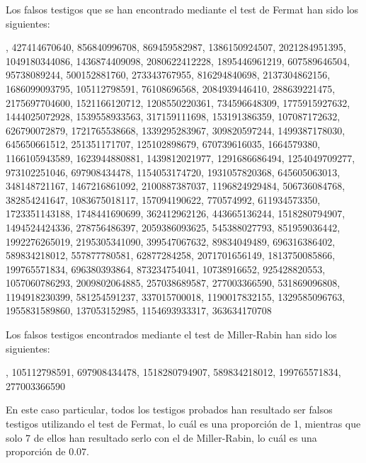 \documentclass[11pt,a4paper]{article}
\begin{document}
Los falsos testigos que se han encontrado mediante el test de Fermat han sido los siguientes:

, 427414670640, 856840996708, 869459582987, 1386150924507, 2021284951395, 1049180344086, 1436874409098, 2080622412228, 1895446961219, 607589646504, 95738089244, 500152881760, 273343767955, 816294840698, 2137304862156, 1686099093795, 105112798591, 76108696568, 2084939446410, 288639221475, 2175697704600, 1521166120712, 1208550220361, 734596648309, 1775915927632, 1444025072928, 1539558933563, 317159111698, 153191386359, 107087172632, 626790072879, 1721765538668, 1339295283967, 309820597244, 1499387178030, 645650661512, 251351171707, 125102898679, 670739616035, 1664579380, 1166105943589, 1623944880881, 1439812021977, 1291686686494, 1254049709277, 973102251046, 697908434478, 1154053174720, 1931057820368, 645605063013, 348148721167, 1467216861092, 2100887387037, 1196824929484, 506736084768, 382854241647, 1083675018117, 157094190622, 770574992, 611934573350, 1723351143188, 1748441690699, 362412962126, 443665136244, 1518280794907, 1494524424336, 278756486397, 2059386093625, 545388027793, 851959036442, 1992276265019, 2195305341090, 399547067632, 89834049489, 696316386402, 589834218012, 557877780581, 62877284258, 2071701656149, 1813750085866, 199765571834, 696380393864, 873234754041, 10738916652, 925428820553, 1057060786293, 2009802064885, 257038689587, 277003366590, 531869096808, 1194918230399, 581254591237, 337015700018, 1190017832155, 1329585096763, 1955831589860, 137053152985, 1154693933317, 363634170708

Los falsos testigos encontrados mediante el test de Miller-Rabin han sido los siguientes:

, 105112798591, 697908434478, 1518280794907, 589834218012, 199765571834, 277003366590

En este caso particular, todos los testigos probados han resultado ser falsos testigos utilizando
el test de Fermat, lo cuál es una proporción de 1, mientras que solo 7 de ellos han resultado
serlo con el de Miller-Rabin, lo cuál es una proporción de $0.07$.
\end{document}
